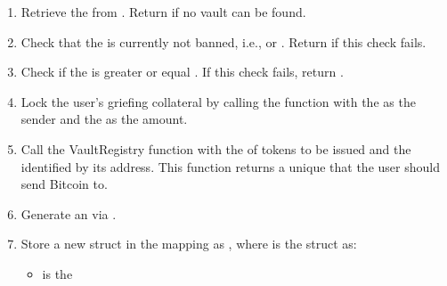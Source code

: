 \documentclass[a4paper,10pt,english]{sphinxmanual}
\begin{document}
\label{\detokenize{spec/issue:function-sequence}}\begin{enumerate}
%
\item {} 
Retrieve the  from {\hyperref[\detokenize{spec/vault-registry:vault-registry}]{}}. Return  if no vault can be found.

\item {} 
Check that the  is currently not banned, i.e.,  or . Return  if this check fails.

\item {} 
Check if the  is greater or equal . If this check fails, return .

\item {} 
Lock the user’s griefing collateral by calling the {\hyperref[\detokenize{spec/collateral:lockcollateral}]{}} function with the  as the sender and the  as the amount.

\item {} 
Call the VaultRegistry {\hyperref[\detokenize{spec/vault-registry:tryincreasetobeissuedtokens}]{}} function with the  of tokens to be issued and the  identified by its address. This function returns a unique  that the user should send Bitcoin to.

\item {} 
Generate an  via {\hyperref[\detokenize{spec/security:generatesecureid}]{}}.

\item {} 
Store a new  struct in the  mapping as , where  is the  struct as:
\begin{itemize}
\item {} 
 is the 


\end{itemize}
\end{enumerate}
\end{document}
